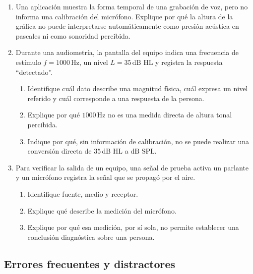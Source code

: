 \begin{enumerate}[label=\textbf{F\arabic*.},leftmargin=*]
    \item Una aplicación muestra la forma temporal de una grabación de voz, pero no informa una calibración del micrófono. Explique por qué la altura de la gráfica no puede interpretarse automáticamente como presión acústica en pascales ni como sonoridad percibida.

    \item Durante una audiometría, la pantalla del equipo indica una frecuencia de estímulo \(f=1000\,\text{Hz}\), un nivel \(L=35\,\text{dB HL}\) y registra la respuesta ``detectado''.
    \begin{enumerate}[label=\alph*)]
        \item Identifique cuál dato describe una magnitud física, cuál expresa un nivel referido y cuál corresponde a una respuesta de la persona.
        \item Explique por qué \(1000\,\text{Hz}\) no es una medida directa de altura tonal percibida.
        \item Indique por qué, sin información de calibración, no se puede realizar una conversión directa de \(35\,\text{dB HL}\) a \(\text{dB SPL}\).
    \end{enumerate}

    \item Para verificar la salida de un equipo, una señal de prueba activa un parlante y un micrófono registra la señal que se propagó por el aire.
    \begin{enumerate}[label=\alph*)]
        \item Identifique fuente, medio y receptor.
        \item Explique qué describe la medición del micrófono.
        \item Explique por qué esa medición, por sí sola, no permite establecer una conclusión diagnóstica sobre una persona.
    \end{enumerate}
\end{enumerate}

\subsection*{Errores frecuentes y distractores}

